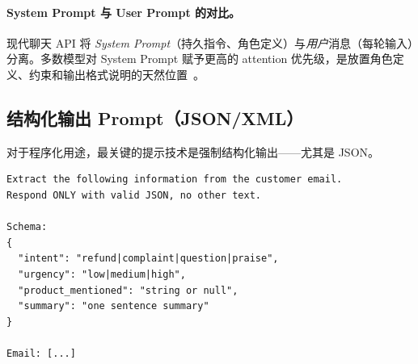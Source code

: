 \paragraph{System Prompt 与 User Prompt 的对比。}
\label{system-prompts-vs.-user-prompts.}

现代聊天 API 将 \emph{System Prompt}（持久指令、角色定义）与\emph{用户}消息（每轮输入）分离。多数模型对 System Prompt 赋予更高的 attention 优先级，是放置角色定义、约束和输出格式说明的天然位置~\cite{openai2023gpt4}。

\subsection{结构化输出 Prompt（JSON/XML）}
\label{structured-output-prompts-jsonxml}

对于程序化用途，最关键的提示技术是强制结构化输出——尤其是 JSON。

\begin{examplebox}
\begin{lstlisting}
Extract the following information from the customer email.
Respond ONLY with valid JSON, no other text.

Schema:
{
  "intent": "refund|complaint|question|praise",
  "urgency": "low|medium|high",
  "product_mentioned": "string or null",
  "summary": "one sentence summary"
}

Email: [...]
\end{lstlisting}
\end{examplebox}

